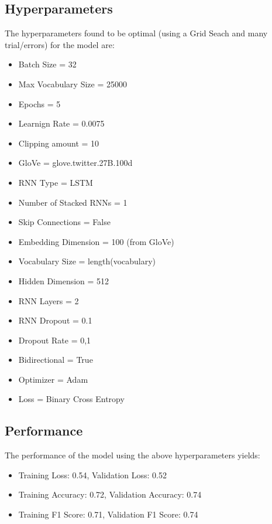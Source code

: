 \documentclass[12pt]{report}
\begin{document}
\subsection*{Hyperparameters}
The hyperparameters found to be optimal (using a Grid Seach and many trial/errors) for the model
are:
\bigskip

\begin{itemize}
    \item Batch Size = 32
    \item Max Vocabulary Size = 25000
    \item Epochs = 5
    \item Learnign Rate = 0.0075
    \item Clipping amount = 10
    \item GloVe = glove.twitter.27B.100d
    \item RNN Type = LSTM
    \item Number of Stacked RNNs = 1
    \item Skip Connections = False
    \item Embedding Dimension = 100 (from GloVe)
    \item Vocabulary Size = length(vocabulary)
    \item Hidden Dimension = 512
    \item RNN Layers = 2
    \item RNN Dropout = 0.1
    \item Dropout Rate = 0,1
    \item Bidirectional = True
    \item Optimizer = Adam
    \item Loss = Binary Cross Entropy
\end{itemize}
\clearpage

\subsection*{Performance}
The performance of the model using the above hyperparameters yields:
\begin{itemize}
    \item Training Loss: 0.54, Validation Loss: 0.52
    \item Training Accuracy: 0.72, Validation Accuracy: 0.74
    \item Training F1 Score: 0.71, Validation F1 Score: 0.74
\end{itemize}
\bigskip
\end{document}

